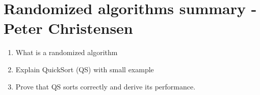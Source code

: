 \section*{Randomized algorithms summary - Peter Christensen}
\begin{enumerate}
	\item What is a randomized algorithm
	\item Explain QuickSort (QS) with small example
	\item Prove that QS sorts correctly and derive its performance.
\end{enumerate}